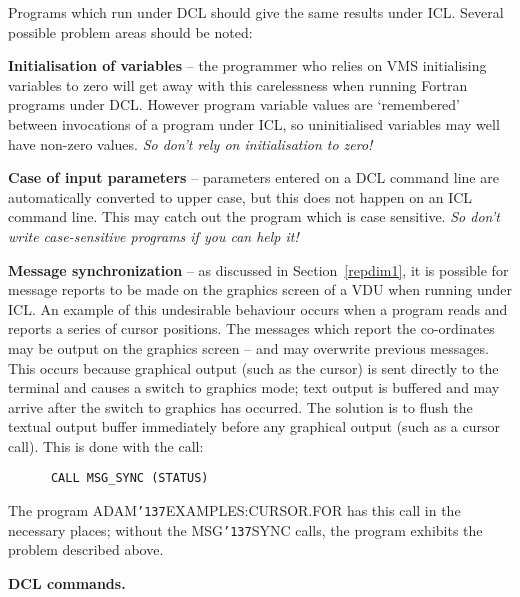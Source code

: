 \documentclass[twoside,11pt]{article}
\renewcommand{\_}{{\tt\char'137}}
\begin{document}
Programs which run under DCL should give the same results under ICL.
Several possible problem areas should be noted:
\begin{description} 
\item{\bf Initialisation of variables} -- the programmer 
who relies on VMS initialising variables to zero will get away with this 
carelessness when running Fortran programs under DCL.
However program variable values are `remembered' between invocations
of a program under ICL, so uninitialised variables may well have 
non-zero values. {\sl So don't rely on initialisation to zero!}

\item{\bf Case of input parameters} -- parameters entered on a DCL
command line are automatically converted to upper case, but this does not
happen on an ICL command line. This may catch out the program which is
case sensitive. {\sl So don't write case-sensitive programs if you can help 
it!}

\item{\bf Message synchronization} -- as discussed in Section~\ref{repdim1},
it is possible for message reports to be 
made on the graphics screen of a VDU when running under ICL.
An example of this undesirable behaviour occurs when a program reads 
and reports a series of cursor positions.
The messages which report the co-ordinates may be output on the graphics 
screen -- and may overwrite previous messages. 
This occurs because graphical output (such as the cursor) is sent directly
to the terminal and causes a switch to graphics mode; text output is 
buffered and may arrive after the switch to graphics has occurred.
The solution is to flush  the textual output buffer immediately before any
graphical output (such as a cursor call).
This is done with the call:
\begin{verbatim}
      CALL MSG_SYNC (STATUS)
\end{verbatim}
The program ADAM\_EXAMPLES:CURSOR.FOR has this call in the necessary places;
without the MSG\_SYNC calls, the program exhibits the problem described 
above.
\end{description}

{\bigskip\large\bf DCL commands.}
\end{document}
